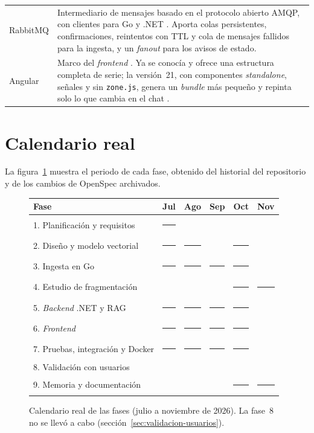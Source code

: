 \begin{table}[htbp]
\begin{tabularx}{\linewidth}{lX}
    RabbitMQ & Intermediario de mensajes basado en el protocolo abierto AMQP, con clientes para Go y .NET \cite{rabbitmq}. Aporta colas persistentes, confirmaciones, reintentos con TTL y cola de mensajes fallidos para la ingesta, y un \emph{fanout} para los avisos de estado. \\
    Angular & Marco del \emph{frontend} \cite{angular}. Ya se conocía y ofrece una estructura completa de serie; la versión~21, con componentes \emph{standalone}, señales y sin \texttt{zone.js}, genera un \emph{bundle} más pequeño y repinta solo lo que cambia en el chat \cite{angular21}. \\
    \bottomrule
  \end{tabularx}
\end{table}

\section{Calendario real}
\label{sec:calendario}

La figura~\ref{fig:gantt} muestra el periodo de cada fase, obtenido del historial del repositorio y de los cambios de OpenSpec archivados.

\newcommand{\gbar}{\rule{1.6em}{0.9em}}
\begin{figure}[ht]
  \centering
  \small
  \begin{tabular}{l*{5}{c}}
    \toprule
    Fase & Jul & Ago & Sep & Oct & Nov \\
    \midrule
    1. Planificación y requisitos       & \gbar &       &       &       & \\
    2. Diseño y modelo vectorial        & \gbar & \gbar &       & \gbar & \\
    3. Ingesta en Go                    & \gbar & \gbar & \gbar & \gbar & \\
    4. Estudio de fragmentación         &       &       &       & \gbar & \gbar \\
    5. \emph{Backend} .NET y RAG        & \gbar & \gbar & \gbar & \gbar & \\
    6. \emph{Frontend}                  & \gbar & \gbar & \gbar & \gbar & \\
    7. Pruebas, integración y Docker    & \gbar & \gbar & \gbar & \gbar & \\
    8. Validación con usuarios          &       &       &       &       & \\
    9. Memoria y documentación          &       &       &       & \gbar & \gbar \\
    \bottomrule
  \end{tabular}
  \caption[Calendario real de las fases]{Calendario real de las fases (julio a noviembre de 2026). La fase~8 no se llevó a cabo (sección~\ref{sec:validacion-usuarios}).}
  \label{fig:gantt}
\end{figure}

